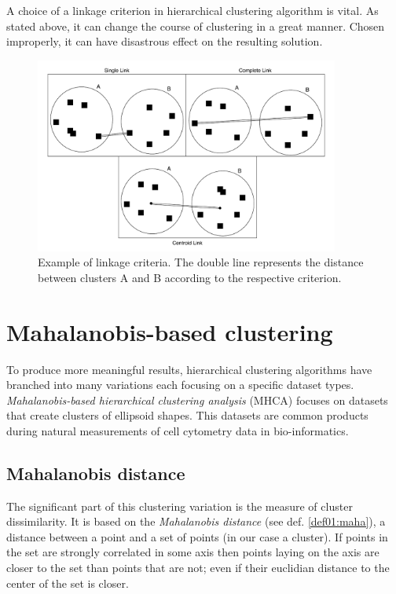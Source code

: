 A choice of a linkage criterion in hierarchical clustering algorithm is vital. As stated above, it can change the course of clustering in a great manner. Chosen improperly, it can have disastrous effect on the resulting solution.

\begin{figure}\centering
	\includegraphics[width=10cm]{img/linkage_criteria}
	\caption{Example of linkage criteria. The double line represents the distance between clusters A and B according to the respective criterion.}
	\label{fig01:link}
\end{figure}

\section{Mahalanobis-based clustering}

To produce more meaningful results, hierarchical clustering algorithms have branched into many variations each focusing on a specific dataset types. \emph{Ma\-ha\-la\-no\-bis-based hierarchical clustering analysis} (MHCA) focuses on datasets that create clusters of ellipsoid shapes. This datasets are common products during natural measurements of cell cytometry data in bio-informatics.

\subsection{Mahalanobis distance}

The significant part of this clustering variation is the measure of cluster dissimilarity. It is based on the \emph{Mahalanobis distance} \cite{mahalanobis1936generalized} (see def. \ref{def01:maha}), a distance between a point and a set of points (in our case a cluster). If points in the set are strongly correlated in some axis then points laying on the axis are closer to the set than points that are not; even if their euclidian distance to the center of the set is closer.

